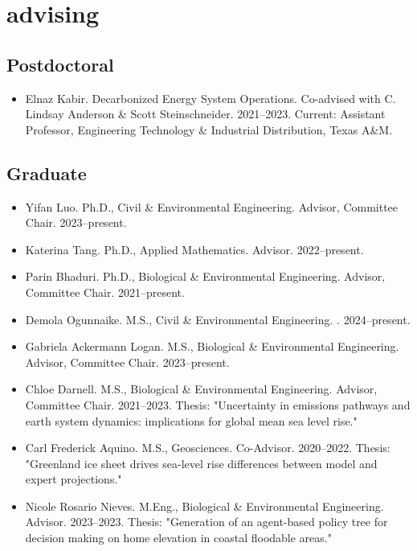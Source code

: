 \documentclass[11pt,article,oneside]{memoir}
\begin{document}

\section{advising}

\mbox{}\vspace{-\dimexpr\baselineskip\relax}

\vspace{\baselineskip}


\subsection{Postdoctoral}
\begin{itemize}[label={}]


\item Elnaz Kabir. Decarbonized Energy System Operations. Co-advised with C. Lindsay Anderson \& Scott Steinschneider. 2021--2023.  Current: Assistant Professor, Engineering Technology \& Industrial Distribution, Texas A\&M.


\end{itemize}

\subsection{Graduate}
\begin{itemize}[label={}]


\item Yifan Luo. Ph.D., Civil \& Environmental Engineering. Advisor, Committee Chair. 2023--present.  

\item Katerina Tang. Ph.D., Applied Mathematics. Advisor. 2022--present.  

\item Parin Bhaduri. Ph.D., Biological \& Environmental Engineering. Advisor, Committee Chair. 2021--present.  

\item Demola Ogunnaike. M.S., Civil \& Environmental Engineering. . 2024--present.  

\item Gabriela Ackermann Logan. M.S., Biological \& Environmental Engineering. Advisor, Committee Chair. 2023--present.  

\item Chloe Darnell. M.S., Biological \& Environmental Engineering. Advisor, Committee Chair. 2021--2023.  Thesis: "Uncertainty in emissions pathways and earth system dynamics: implications for global mean sea level rise." 

\item Carl Frederick Aquino. M.S., Geosciences. Co-Advisor. 2020--2022.  Thesis: "Greenland ice sheet drives sea-level rise differences between model and expert projections." 

\item Nicole Rosario Nieves. M.Eng., Biological \& Environmental Engineering. Advisor. 2023--2023.  Thesis: "Generation of an agent-based policy tree for decision making on home elevation in coastal floodable areas." 


\end{itemize}
\end{document}
